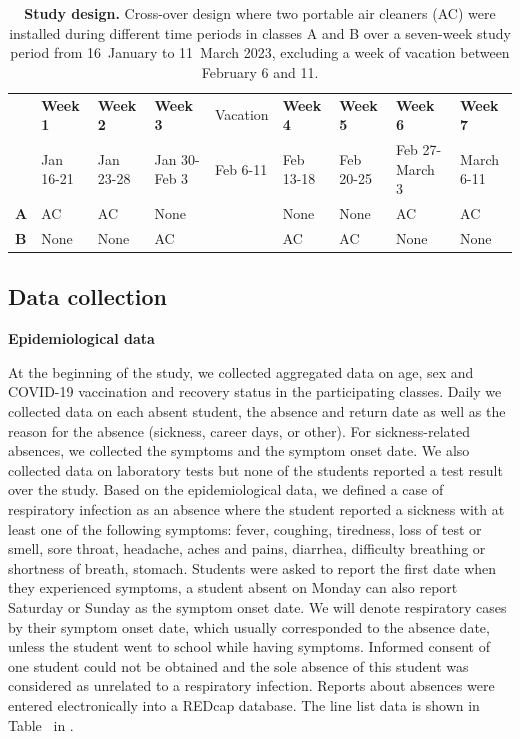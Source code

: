 \documentclass[fleqn,11pt]{wlscirep}
\begin{document}
\begin{table}[!htpb]
    \footnotesize
    \centering
    \caption{\textbf{Study design.} Cross-over design where two portable air cleaners (AC) were installed during different time periods in classes A and B over a seven-week study period from 16~January to 11~March 2023, excluding a week of vacation between February 6 and 11.}\label{tab:study_design}
    \begin{tabular}{l l l l l l l l l}
    \toprule
      & \textbf{Week 1} & \textbf{Week 2} & \textbf{Week 3} & Vacation & \textbf{Week 4} & \textbf{Week 5} & \textbf{Week 6} & \textbf{Week 7} \\
      & Jan 16-21 & Jan 23-28 & Jan 30-Feb 3 & Feb 6-11 & Feb 13-18 & Feb 20-25 & Feb 27-March 3 & March 6-11 \\
      \midrule
      \textbf{A} & \cellcolor{gray!50} AC & \cellcolor{gray!50} AC & \cellcolor{gray!10} None & & \cellcolor{gray!10} None & \cellcolor{gray!10} None & \cellcolor{gray!50} AC & \cellcolor{gray!50} AC \\
      \textbf{B} & \cellcolor{gray!10} None & \cellcolor{gray!10} None & \cellcolor{gray!50} AC & & \cellcolor{gray!50} AC & \cellcolor{gray!50} AC & \cellcolor{gray!10} None & \cellcolor{gray!10} None \\
      \bottomrule
    \end{tabular}
\end{table}
 
\subsection{Data collection}

\noindent\textbf{Epidemiological data} \smallskip

\noindent At the beginning of the study, we collected aggregated data on age, sex and COVID-19 vaccination and recovery status in the participating classes. Daily we collected data on each absent student, \ie the absence and return date as well as the reason for the absence (sickness, career days,  or other). For sickness-related absences, we collected the symptoms and the symptom onset date. We also collected data on laboratory tests but none of the students reported a test result over the study. Based on the epidemiological data, we defined a case of respiratory infection as an absence where the student reported a sickness with at least one of the following symptoms: fever, coughing, tiredness, loss of test or smell, sore throat, headache, aches and pains, diarrhea, difficulty breathing or shortness of breath, stomach. Students were asked to report the first date when they experienced symptoms, \eg a student absent on Monday can also report Saturday or Sunday as the symptom onset date. We will denote respiratory cases by their symptom onset date, which usually corresponded to the absence date, unless the student went to school while having symptoms. Informed consent of one student could not be obtained and the sole absence of this student was considered as unrelated to a respiratory infection. Reports about absences were entered electronically into a REDcap database\cite{Harris2009,Harris2019}. The line list data is shown in Table~ in \supp. 
\end{document}
